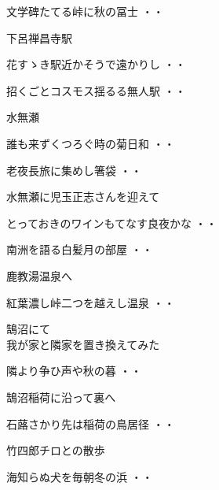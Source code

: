 \begin{shiika}文学碑たてる峠に秋の冨士
\hfill{・・}\end{shiika}
\vspace{0.6cm}
下呂禅昌寺駅
\begin{shiika}花すゝき駅近かそうで遠かりし
\hfill{・・}\end{shiika}
\begin{shiika}招くごとコスモス揺るる無人駅
\hfill{・・}\end{shiika}
\vspace{0.6cm}
水無瀬
\begin{shiika}誰も来ずくつろぐ時の菊日和
\hfill{・・}\end{shiika}
\vspace{0.6cm}
\begin{shiika}老夜長旅に集めし箸袋
\hfill{・・}\end{shiika}
\vspace{0.6cm}
水無瀬に児玉正志さんを迎えて
\begin{shiika}とっておきのワインもてなす良夜かな
\hfill{・・}\end{shiika}
\vspace{0.6cm}
\begin{shiika}南洲を語る白髪月の部屋
\hfill{・・}\end{shiika}
\vspace{0.6cm}
鹿教湯温泉へ
\begin{shiika}紅葉濃し峠二つを越えし温泉
\hfill{・・}\end{shiika}
\vspace{0.6cm}
鵠沼にて\\
我が家と隣家を置き換えてみた
\begin{shiika}隣より争ひ声や秋の暮
\hfill{・・}\end{shiika}
\vspace{0.6cm}
鵠沼稲荷に沿って裏へ
\begin{shiika}石蕗さかり先は稲荷の鳥居径
\hfill{・・}\end{shiika}
\vspace{0.6cm}
竹四郎チロとの散歩
\begin{shiika}海知らぬ犬を毎朝冬の浜
\hfill{・・}\end{shiika}
